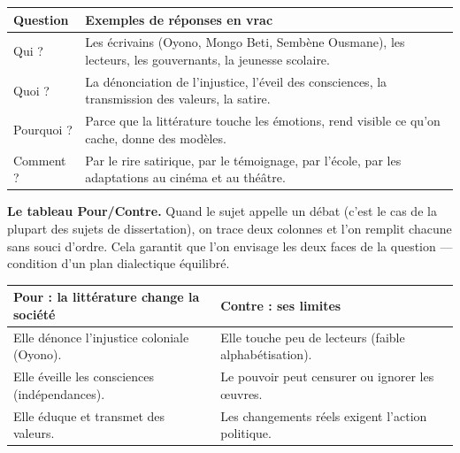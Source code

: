 \documentclass[11pt]{article}
\begin{document}
\begin{center}
\begin{tabularx}{\linewidth}{|l|X|}
\hline
\rowcolor{popblueL} \textbf{Question} & \textbf{Exemples de réponses en vrac} \\
\hline
Qui ? & Les écrivains (Oyono, Mongo Beti, Sembène Ousmane), les lecteurs, les gouvernants, la jeunesse scolaire. \\
\hline
Quoi ? & La dénonciation de l'injustice, l'éveil des consciences, la transmission des valeurs, la satire. \\
\hline
Pourquoi ? & Parce que la littérature touche les émotions, rend visible ce qu'on cache, donne des modèles. \\
\hline
Comment ? & Par le rire satirique, par le témoignage, par l'école, par les adaptations au cinéma et au théâtre. \\
\hline
\end{tabularx}
\end{center}

\textbf{Le tableau Pour/Contre.} Quand le sujet appelle un débat (c'est le cas de la plupart des sujets de dissertation), on trace deux colonnes et l'on remplit chacune sans souci d'ordre. Cela garantit que l'on envisage les deux faces de la question — condition d'un plan dialectique équilibré.

\begin{center}
\begin{tabularx}{\linewidth}{|X|X|}
\hline
\rowcolor{popblueL} \textbf{Pour : la littérature change la société} & \textbf{Contre : ses limites} \\
\hline
Elle dénonce l'injustice coloniale (Oyono). & Elle touche peu de lecteurs (faible alphabétisation). \\
\hline
Elle éveille les consciences (indépendances). & Le pouvoir peut censurer ou ignorer les œuvres. \\
\hline
Elle éduque et transmet des valeurs. & Les changements réels exigent l'action politique. \\
\hline
\end{tabularx}
\end{center}
\end{document}
